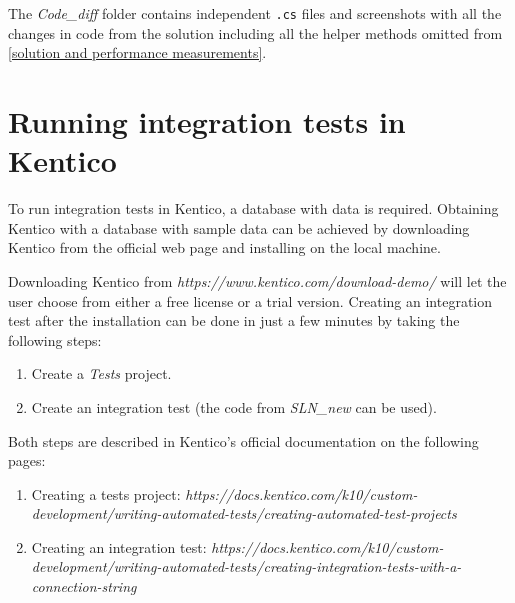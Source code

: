 \documentclass[
  print,
  table,
  nolof,
  nolot,
  nocover,
  oneside
]{fithesis3}
\begin{document}
The \textit{Code\_diff} folder contains independent \texttt{.cs} files and screenshots with all the changes in code from the solution including all the helper methods omitted from \autoref{solution and performance measurements}.


\section{Running integration tests in Kentico}
\label{runningintegrationtests}

To run integration tests in Kentico, a database with data is required. Obtaining Kentico with a database with sample data can be achieved by downloading Kentico from the official web page and installing on the local machine.

Downloading Kentico from \textit{https://www.kentico.com/download-demo/} will let the user choose from either a free license or a trial version. Creating an integration test after the installation can be done in just a few minutes by taking the following steps:
\begin{enumerate}
    \item Create a \textit{Tests} project.
    \item Create an integration test (the code from \textit{SLN\_new} can be used).
\end{enumerate}

Both steps are described in Kentico's official documentation on the following pages:
\begin{enumerate}
    \item Creating a tests project:\newline
    \textit{https://docs.kentico.com/k10/custom-development/writing-automated-tests/creating-automated-test-projects}
    \item Creating an integration test:\newline
    \textit{https://docs.kentico.com/k10/custom-development/writing-automated-tests/creating-integration-tests-with-a-connection-string}
\end{enumerate}
\end{document}
